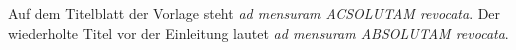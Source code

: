 Auf dem Titelblatt der Vorlage steht \textit{ad mensuram ACSOLUTAM revocata}. Der wiederholte Titel vor der Einleitung lautet \textit{ad mensuram ABSOLUTAM revocata}.
